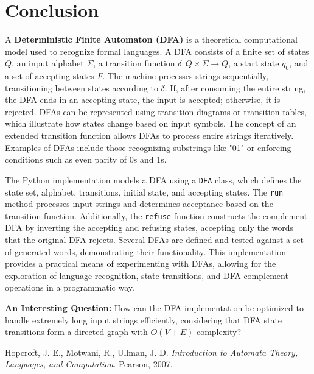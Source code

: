\documentclass{article}
\begin{document}
\newpage

\section{Conclusion}
\maketitle

A \textbf{Deterministic Finite Automaton (DFA)} is a theoretical computational model used to recognize formal languages. A DFA consists of a finite set of states \( Q \), an input alphabet \( \Sigma \), a transition function \( \delta: Q \times \Sigma \to Q \), a start state \( q_0 \), and a set of accepting states \( F \). The machine processes strings sequentially, transitioning between states according to \( \delta \). If, after consuming the entire string, the DFA ends in an accepting state, the input is accepted; otherwise, it is rejected. DFAs can be represented using transition diagrams or transition tables, which illustrate how states change based on input symbols. The concept of an extended transition function allows DFAs to process entire strings iteratively. Examples of DFAs include those recognizing substrings like "01" or enforcing conditions such as even parity of 0s and 1s.

The Python implementation models a DFA using a \texttt{DFA} class, which defines the state set, alphabet, transitions, initial state, and accepting states. The \texttt{run} method processes input strings and determines acceptance based on the transition function. Additionally, the \texttt{refuse} function constructs the complement DFA by inverting the accepting and refusing states, accepting only the words that the original DFA rejects. Several DFAs are defined and tested against a set of generated words, demonstrating their functionality. This implementation provides a practical means of experimenting with DFAs, allowing for the exploration of language recognition, state transitions, and DFA complement operations in a programmatic way.

\textbf{An Interesting Question: } How can the DFA implementation be optimized to handle extremely long input strings efficiently, considering that DFA state transitions form a directed graph with \( O(V + E) \) complexity?
\newpage

\begin{thebibliography}{9}
 Hopcroft, J. E., Motwani, R., Ullman, J. D. \textit{Introduction to Automata Theory, Languages, and Computation}. Pearson, 2007.
\end{thebibliography}
\end{document}
